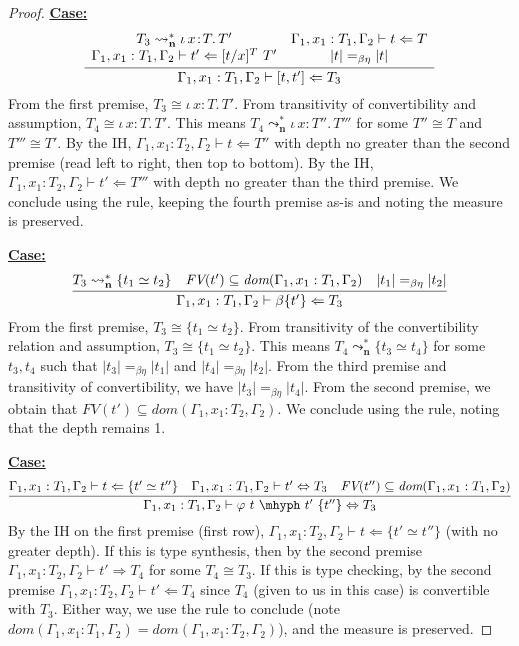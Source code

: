 \documentclass{article}
\newcommand{\abs}[4]{{#1}\, #2\! : \! #3.\, #4}
\newcommand{\leadstocs}[0]{\ensuremath{\leadsto_{\mathbf{n}}^*}}
\newcommand{\tpcheck}[0]{\Leftarrow}
\newcommand{\tpsynth}[0]{\Rightarrow}
\newcommand{\startcase}[1]{\vspace{#1} \noindent\textbf{\underline{Case:}}}
\begin{document}
\begin{proof}
  \startcase{.2cm}
  \[
    \infer{
      \Gamma_1,x_1:T_1,\Gamma_2 \vdash [ t , t' ] \tpcheck T_3
    }{
      \begin{array}{cc}
        T_3 \leadstocs \abs{\iota}{x}{T}{T'}
        & \Gamma_1,x_1:T_1,\Gamma_2 \vdash t \tpcheck T
        \\ \Gamma_1,x_1:T_1,\Gamma_2 \vdash t' \tpcheck [t/x]^{T}\ T'
        & |t| =_{\beta\eta} |t|
      \end{array}
    }
  \]
  From the first premise, \(T_3 \cong \abs{\iota}{x}{T}{T'}\).
  From transitivity of convertibility and assumption, \(T_4 \cong
  \abs{\iota}{x}{T}{T'}\).
  This means \(T_4 \leadstocs \abs{\iota}{x}{T''}{T'''}\) for some \(T'' \cong T\)
  and \(T''' \cong T'\).
  By the IH, \(\Gamma_1,x_1:T_2,\Gamma_2 \vdash t \tpcheck T''\) with depth no
  greater than the second premise (read left to right, then top to bottom).
  By the IH, \(\Gamma_1,x_1:T_2,\Gamma_2 \vdash t' \tpcheck T'''\) with depth no
  greater than the third premise.
  We conclude using the rule, keeping the fourth premise as-is and noting the
  measure is preserved.

  \startcase{.2cm}
  \[
    \infer{
      \Gamma_1,x_1:T_1,\Gamma_2 \vdash \beta\{t'\} \tpcheck T_3
    }{
      T_3 \leadstocs \{t_1 \simeq t_2\}
      \quad \textit{FV}(t')\subseteq \textit{dom}(\Gamma_1,x_1:T_1,\Gamma_2)
      \quad |t_1| =_{\beta\eta} |t_2|
    }
  \]
  From the first premise, \(T_3 \cong \{t_1 \simeq t_2\}\).
  From transitivity of the convertibility relation and assumption, \(T_3 \cong
  \{t_1 \simeq t_2\}\).
  This means \(T_4 \leadstocs \{t_3 \simeq t_4\}\) for some \(t_3,t_4\)
  such that \(|t_3| =_{\beta\eta} |t_1|\) and \(|t_4| =_{\beta\eta} |t_2|\).
  From the third premise and transitivity of convertibility, we have \(|t_3|
  =_{\beta\eta} |t_4|\).
  From the second premise, we obtain that \(\textit{FV}(t') \subseteq
  \textit{dom}(\Gamma_1,x_1:T_2,\Gamma_2)\).
  We conclude using the rule, noting that the depth remains 1.

  \startcase{.2cm}
  \[
    \infer{\Gamma_1,x_1:T_1,\Gamma_2\vdash \varphi\ t\ \mhyph\ t'\ \{t''\} \Leftrightarrow T_3}
    {
      \Gamma_1,x_1:T_1,\Gamma_2\vdash t\tpcheck \{t' \simeq t''\}
      & \Gamma_1,x_1:T_1,\Gamma_2\vdash t' \Leftrightarrow T_3
      & \textit{FV}(t'') \subseteq \textit{dom}(\Gamma_1,x_1:T_1,\Gamma_2)
    }
  \]
  By the IH on the first premise (first row), \(\Gamma_1,x_1:T_2,\Gamma_2 \vdash
  t \tpcheck \{t' \simeq t''\}\) (with no greater depth).
  If this is type synthesis, then by the second premise
  \(\Gamma_1,x_1:T_2,\Gamma_2 \vdash t' \tpsynth T_4\) for some \(T_4 \cong
  T_3\).
  If this is type checking, by the second premise \(\Gamma_1,x_1:T_2,\Gamma_2
  \vdash t' \tpcheck T_4\) since \(T_4\) (given to us in this case) is
  convertible with \(T_3\).
  Either way, we use the rule to conclude (note
  \(\textit{dom}(\Gamma_1,x_1:T_1,\Gamma_2) =
  \textit{dom}(\Gamma_1,x_1:T_2,\Gamma_2)\)), and the measure is preserved.


\end{proof}
\end{document}
